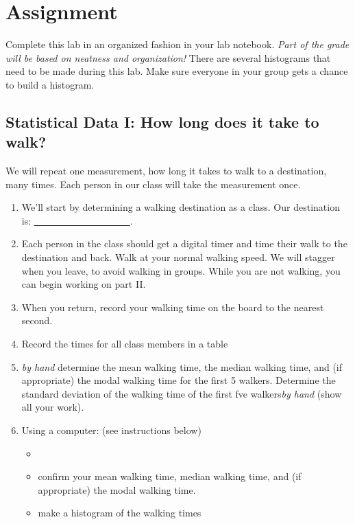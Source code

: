\documentclass{book}%
\begin{document}
\pagebreak

\section{Assignment}

Complete this lab in an organized fashion in your lab notebook. \emph{Part
of the grade will be based on neatness and organization!} There are several
histograms that need to be made during this lab. Make sure everyone in your
group gets a chance to build a histogram.

\subsection{Statistical Data I: How long does it take to walk?}

We will repeat one measurement, how long it takes to walk to a destination,
many times. Each person in our class will take the measurement once.

\begin{enumerate}
\item We'll start by determining a walking destination as a class. Our
destination is: \underline{\ \ \ \ \ \ \ \ \ \ \ \ \ \ \ \ \ \ \ \ }.

\item Each person in the class should get a digital timer and time their
walk to the destination and back. Walk at your normal walking speed. We will
stagger when you leave, to avoid walking in groups. While you are not
walking, you can begin working on part II.

\item When you return, record your walking time on the board to the nearest
second.

\item Record the times for all class members in a table
\item  \emph{by hand}
determine the mean walking time, the median walking time, and (if
appropriate) the modal walking time for the first 5 walkers. Determine the standard deviation of the
walking time of the first fve walkers\emph{by hand} (show all your work).

\item Using a computer: (see instructions below)
\begin{itemize}
\item 
\item confirm your mean walking time, median walking time, and (if appropriate) the modal walking time.
\item make a histogram of the walking times 
\end{itemize}
\end{enumerate}
\end{document}
